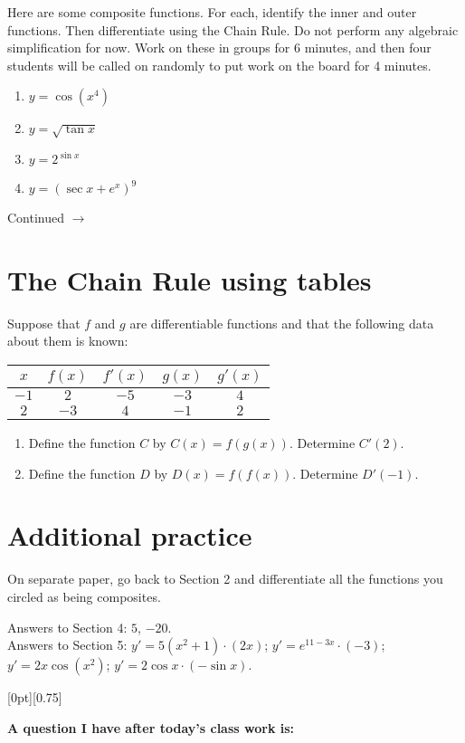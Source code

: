 \documentclass[11pt]{article}
\newcommand{\cuthere}{%
\noindent
\raisebox{-2.8pt}[0pt][0.75\baselineskip]{\small\ding{34}}
\unskip{\tiny\dotfill}
}
\def\ra{\rightarrow}
\def\pageturn{\vfill 
\begin{flushright}
	\begin{small}
		Continued $\ra$
	\end{small}
\end{flushright} \newpage}
\begin{document}
Here are some composite functions. For each, identify the inner and outer functions. Then differentiate using the Chain Rule. Do not perform any algebraic simplification for now. Work on these in groups for 6 minutes, and then four students will be called on randomly to put work on the board for 4 minutes. 

\begin{enumerate}
	\item $y = \cos(x^4)$
	\item $y = \sqrt{\tan x}$
	\item $y = 2^{\sin x}$
	\item $y = (\sec x + e^x)^9$
\end{enumerate}	

\pageturn

\section{The Chain Rule using tables}
	
Suppose that $f$ and $g$ are differentiable functions and that the following data about them is known: 
\begin{center}
	\begin{tabular}{c||c|c|c|c}
	$x$ & $f(x)$ & $f'(x)$ & $g(x)$ & $g'(x)$ \\ \hline
	$-1$ & $2$ & $-5$ & $-3$ & $4$ \\ \hline
	$2$ & $-3$ & $4$ & $-1$ & $2$ 
	\end{tabular}
\end{center}

\begin{enumerate}
	\item Define the function $C$ by $C(x) = f(g(x))$. Determine $C'(2)$. 
	
	\vspace{1in}
	
	\item Define the function $D$ by $D(x) = f(f(x))$. Determine $D'(-1)$. 
	
	\vspace{1in}
	
\end{enumerate}

\section{Additional practice}
On separate paper, go back to Section 2 and differentiate all the functions you circled as being composites. 	
	
\vfill
	
\begin{small}
	Answers to Section 4: $5$, $-20$. \\
	Answers to Section 5: $y' = 5(x^2 + 1) \cdot (2x)$; $y' = e^{11-3x} \cdot (-3)$; $y' = 2x \cos(x^2)$; $y' = 2 \cos x \cdot (- \sin x)$. 
\end{small}


\cuthere

\noindent
\textbf{A question I have after today's class work is:}

\vspace{1in}
\end{document}
